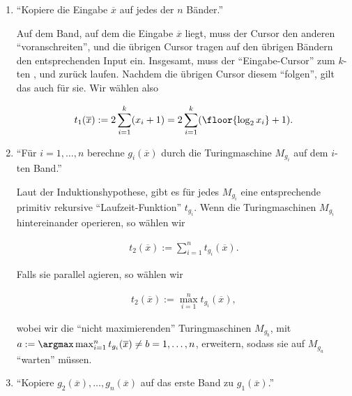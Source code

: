 \begin{solution}
\begin{enumerate}[wide, labelindent = 0pt]
\begin{itemize}
\begin{enumerate}[label = \arabic*.]
            \item \enquote{Kopiere die Eingabe $\overline x$ auf jedes der $n$ Bänder.}

            Auf dem Band, auf dem die Eingabe $\overline x$ liegt, muss der Cursor den anderen \enquote{voranschreiten}, und die übrigen Cursor tragen auf den übrigen Bändern den entsprechenden Input ein.
            Insgesamt, muss der \enquote{Eingabe-Cursor} zum $k$-ten \textvisiblespace, und zurück laufen.
            Nachdem die übrigen Cursor diesem \enquote{folgen}, gilt das auch für sie.
            Wir wählen also

            \begin{align*}
                t_1(\overline x)
                :=
                2
                \sum_{i=1}^k
                    (x_i + 1)
                =
                2
                \sum_{i=1}^k
                    (\floor{\log_2 x_i} + 1).
            \end{align*}
            
            \item \enquote{Für $i = 1, \dots, n$ berechne $g_i(\overline x)$ durch die Turingmaschine $M_{g_i}$ auf dem $i$-ten Band.}

            Laut der Induktionshypothese, gibt es für jedes $M_{g_i}$ eine entsprechende primitiv rekursive \enquote{Laufzeit-Funktion} $t_{g_i}$.
            Wenn die Turingmaschinen $M_{g_i}$ hintereinander operieren, so wählen wir

            \begin{align*}
                t_2(\overline x)
                :=
                \sum_{i=1}^n
                    t_{g_i}(\overline x).
            \end{align*}

            Falls sie parallel agieren, so wählen wir

            \begin{align*}
                t_2(\overline x)
                :=
                \max_{i=1}^n
                    t_{g_i}(\overline x),
            \end{align*}

            wobei wir die \enquote{nicht maximierenden} Turingmaschinen $M_{g_b}$, mit $a := \argmax \max_{i=1}^n t_{g_i}(\overline x) \neq b = 1, \dots, n$, erweitern, sodass sie auf $M_{g_a}$ \enquote{warten} müssen.
            
            \item \enquote{Kopiere $g_2(\overline x), \dots, g_n(\overline x)$ auf das erste Band zu $g_1(\overline x)$.}


\end{enumerate}
\end{itemize}
\end{enumerate}
\end{solution}

